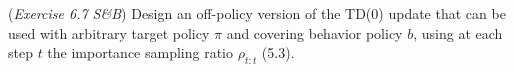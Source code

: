 (\textit{Exercise 6.7 S\&B}) Design an off-policy version of the TD(0) update that can be used with arbitrary target policy $\pi$ and covering behavior policy $b$, using at each step $t$ the importance sampling ratio $\rho_{t:t}$ (5.3).




